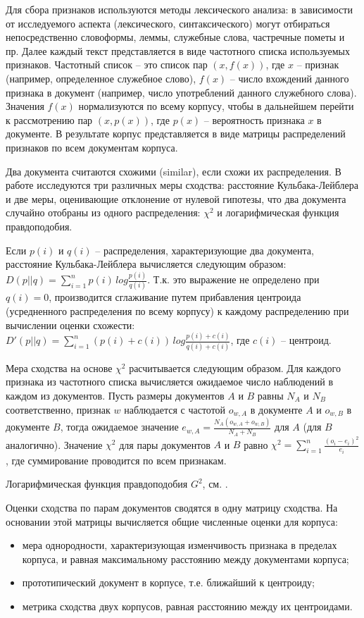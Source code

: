 Для сбора признаков используются методы лексического анализа: в зависимости от исследуемого аспекта (лексического, синтаксического) могут отбираться непосредственно словоформы, леммы, служебные слова, частречные пометы и пр. Далее каждый текст представляется в виде частотного списка используемых признаков. Частотный список -- это список пар $(x, f(x))$, где $x$ -- признак (например, определенное служебное слово), $f(x)$ -- число вхождений данного признака в документ (например, число употреблений данного служебного слова). Значения $f(x)$ нормализуются по всему корпусу, чтобы в дальнейшем перейти к рассмотрению пар $(x, p(x))$, где $p(x)$ -- вероятность признака $x$ в документе. В результате корпус представляется в виде матрицы распределений признаков по всем документам корпуса.

Два документа считаются схожими (similar), если схожи их распределения. В работе исследуются три различных меры сходства: расстояние Кульбака-Лейблера и две меры, оценивающие отклонение от нулевой гипотезы, что два документа случайно отобраны из одного распределения: $\chi^2$ и логарифмическая функция правдоподобия.

Если $p(i)$ и $q(i)$ -- распределения, характеризующие два документа, расстояние Кульбака-Лейблера вычисляется следующим образом: $D(p||q) = \sum_{i=1}^{n}p(i)\,log\frac{p(i)}{q(i)}$. Т.к. это выражение не определено при $q(i)=0$, производится сглаживание путем прибавления центроида (усредненного распределения по всему корпусу) к каждому распределению при вычислении оценки схожести: $D'(p||q) = \sum_{i=1}^{n}(p(i)+c(i))\,log\frac{p(i)+c(i)}{q(i)+c(i)}$, где $c(i)$ -- центроид.

Мера сходства на основе $\chi^2$ расчитывается следующим образом. Для каждого признака из частотного списка вычисляется ожидаемое число наблюдений в каждом из документов. Пусть размеры документов $A$ и $B$ равны $N_A$ и $N_B$ соответственно, признак $w$ наблюдается с частотой $o_{w,A}$ в документе $A$ и $o_{w,B}$ в документе $B$, тогда ожидаемое значение $e_{w,A} = \frac{N_A(o_{w,A}+o_{w,B})}{N_A+N_B}$ для $A$ (для $B$ аналогично). Значение $\chi^2$ для пары документов $A$ и $B$ равно $\chi^2 = \sum_{i=1}^{n}\frac{(o_i-e_i)^2}{e_i}$, где суммирование проводится по всем признакам.

Логарифмическая функция правдоподобия $G^2$, см. \parencite{dunning1993accurate}.

Оценки сходства по парам документов сводятся в одну матрицу сходства. На основании этой матрицы вычисляется общие численные оценки для корпуса:
\begin{itemize}
    \item мера однородности, характеризующая изменчивость признака в пределах корпуса, и равная максимальному расстоянию между документами корпуса;
    \item прототипический документ в корпусе, т.е. ближайший к центроиду;
    \item метрика сходства двух корпусов, равная расстоянию между их центроидами.
\end{itemize}


